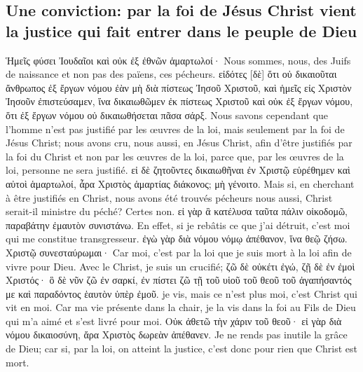 \documentclass[14pt,a4paper,twoside]{extarticle}
\begin{document}
\begin{paracol}[1]
  \subsection*{Une conviction: par la foi de Jésus Christ vient la justice qui fait entrer dans le peuple de Dieu}
  \verset
  {Ἡμεῖς φύσει Ἰουδαῖοι καὶ οὐκ ἐξ ἐθνῶν ἁμαρτωλοί·}
  {Nous sommes, nous, des Juifs de naissance et non pas des païens, ces pécheurs.}
  \verset
  {εἰδότες [δὲ] ὅτι οὐ δικαιοῦται ἄνθρωπος ἐξ ἔργων νόμου ἐὰν μὴ διὰ πίστεως Ἰησοῦ Χριστοῦ, καὶ ἡμεῖς εἰς Χριστὸν Ἰησοῦν ἐπιστεύσαμεν, ἵνα δικαιωθῶμεν ἐκ πίστεως Χριστοῦ καὶ οὐκ ἐξ ἔργων νόμου, ὅτι ἐξ ἔργων νόμου οὐ δικαιωθήσεται πᾶσα σάρξ.}
  {Nous savons cependant que l’homme n’est pas justifié par les œuvres de la loi, mais seulement par la foi de Jésus Christ; nous avons cru, nous aussi, en Jésus Christ, afin d’être justifiés par la foi du Christ et non par les œuvres de la loi, parce que, par les œuvres de la loi, personne ne sera justifié.}
  \verset
  {εἰ δὲ ζητοῦντες δικαιωθῆναι ἐν Χριστῷ εὑρέθημεν καὶ αὐτοὶ ἁμαρτωλοί, ἆρα Χριστὸς ἁμαρτίας διάκονος; μὴ γένοιτο.}
  {Mais si, en cherchant à être justifiés en Christ, nous avons été trouvés pécheurs nous aussi, Christ serait-il ministre du péché? Certes non.}
  \verset
  {εἰ γὰρ ἃ κατέλυσα ταῦτα πάλιν οἰκοδομῶ, παραβάτην ἐμαυτὸν συνιστάνω.}
  {En effet, si je rebâtis ce que j’ai détruit, c’est moi qui me constitue transgresseur.}
  \verset
  {ἐγὼ γὰρ διὰ νόμου νόμῳ ἀπέθανον, ἵνα θεῷ ζήσω. Χριστῷ συνεσταύρωμαι·}
  {Car moi, c’est par la loi que je suis mort à la loi afin de vivre pour Dieu. Avec le Christ, je suis un crucifié;}
  \verset
  {ζῶ δὲ οὐκέτι ἐγώ, ζῇ δὲ ἐν ἐμοὶ Χριστός· ὃ δὲ νῦν ζῶ ἐν σαρκί, ἐν πίστει ζῶ τῇ τοῦ υἱοῦ τοῦ θεοῦ τοῦ ἀγαπήσαντός με καὶ παραδόντος ἑαυτὸν ὑπὲρ ἐμοῦ.}
  {je vis, mais ce n’est plus moi, c’est Christ qui vit en moi. Car ma vie présente dans la chair, je la vis dans la foi au Fils de Dieu qui m’a aimé et s’est livré pour moi.}
  \verset
  {Οὐκ ἀθετῶ τὴν χάριν τοῦ θεοῦ· εἰ γὰρ διὰ νόμου δικαιοσύνη, ἄρα Χριστὸς δωρεὰν ἀπέθανεν.}
  {Je ne rends pas inutile la grâce de Dieu; car si, par la loi, on atteint la justice, c’est donc pour rien que Christ est mort.}


\end{paracol}
\end{document}
